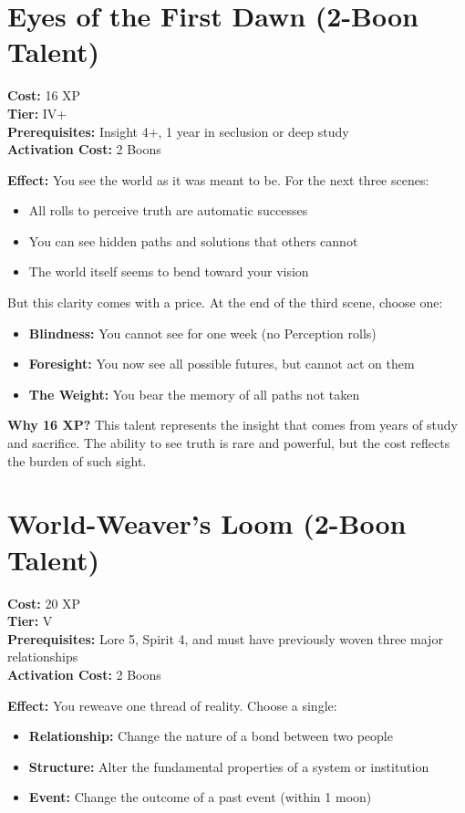 \documentclass[11pt]{book}
\begin{document}
\section{Eyes of the First Dawn (2-Boon Talent)}
\textbf{Cost:} 16 XP \\
\textbf{Tier:} IV+ \\
\textbf{Prerequisites:} Insight 4+, 1 year in seclusion or deep study \\
\textbf{Activation Cost:} 2 Boons

\textbf{Effect:} You see the world as it was meant to be. For the next three scenes:
\begin{itemize}
  \item All rolls to perceive truth are automatic successes
  \item You can see hidden paths and solutions that others cannot
  \item The world itself seems to bend toward your vision
\end{itemize}

But this clarity comes with a price. At the end of the third scene, choose one:
\begin{itemize}
  \item \textbf{Blindness:} You cannot see for one week (no Perception rolls)
  \item \textbf{Foresight:} You now see all possible futures, but cannot act on them
  \item \textbf{The Weight:} You bear the memory of all paths not taken
\end{itemize}

\textbf{Why 16 XP?} This talent represents the insight that comes from years of study and sacrifice. The ability to see truth is rare and powerful, but the cost reflects the burden of such sight.

\section{World-Weaver's Loom (2-Boon Talent)}
\textbf{Cost:} 20 XP \\
\textbf{Tier:} V \\
\textbf{Prerequisites:} Lore 5, Spirit 4, and must have previously woven three major relationships \\
\textbf{Activation Cost:} 2 Boons

\textbf{Effect:} You reweave one thread of reality. Choose a single:
\begin{itemize}
  \item \textbf{Relationship:} Change the nature of a bond between two people
  \item \textbf{Structure:} Alter the fundamental properties of a system or institution
  \item \textbf{Event:} Change the outcome of a past event (within 1 moon)
\end{itemize}
\end{document}
